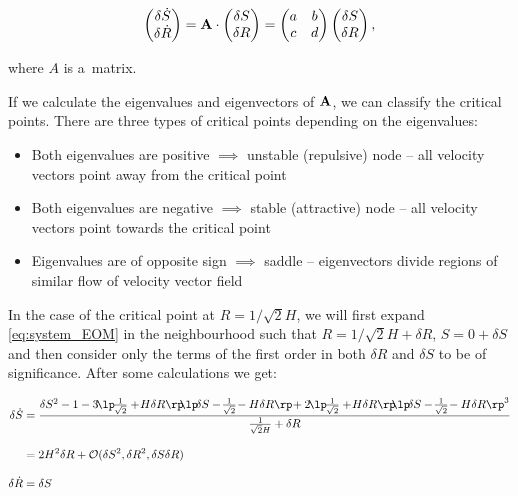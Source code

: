 \begin{equation}
    \begin{pmatrix}
        \delta \dot{S} \\ \delta \dot{R}
    \end{pmatrix}
    =
    \bf{A} \cdot
    \begin{pmatrix}
        \delta S \\ \delta R
    \end{pmatrix} =
    \begin{pmatrix}
        a & b \\
        c & d
    \end{pmatrix}
    \begin{pmatrix}
        \delta S \\ \delta R
    \end{pmatrix},
\end{equation}

\noindent
where $A$ is a~matrix. 

If we calculate the eigenvalues and eigenvectors of $\bf{A}$, we can classify the critical points. There are three types of critical points depending on the eigenvalues: 
\begin{itemize}
    \item Both eigenvalues are positive $\implies$ unstable (repulsive) node -- all velocity vectors point away from the critical point
    \item Both eigenvalues are negative $\implies$ stable (attractive) node -- all velocity vectors point towards the critical point
    \item Eigenvalues are of opposite sign $\implies$ saddle -- eigenvectors divide regions of similar flow of velocity vector field
\end{itemize}

\noindent
In the case of the critical point at $R = 1/\sqrt{2}H$, we will first expand \cref{eq:system_EOM} in the neighbourhood such that $R = 1/\sqrt{2}H + \delta R$, $S =  0+ \delta S$ and then consider only the terms of the first order in both $\delta R$ and $ \delta S$ to be of significance. 
After some calculations we get:

\begin{equation}
    \begin{aligned}
        \delta \dot{S} & =  \frac{\delta S^2 - 1 - 3 \! \lp \! \frac{1}{\sqrt{2}} + \! H\delta R \rp \! \! \lp  \! \delta S - \! \frac{1}{\sqrt{2}} \! - H \delta R \rp \! + 2 \! \lp \! \frac{1}{\sqrt{2}} + \! H \delta R \rp  \! \! \lp \! \delta S - \! \frac{1}{\sqrt{2}} \! - H \delta R \rp^3}{\frac{1}{\sqrt{2} H} + \delta R} \\[0.3cm]
        & =  2H^2 \delta R + \mathcal{O}(\delta S^2, \delta R^2, \delta S \delta R)\\[0.3cm]
        \delta \dot{R} & = \delta S
    \end{aligned}
\end{equation}

